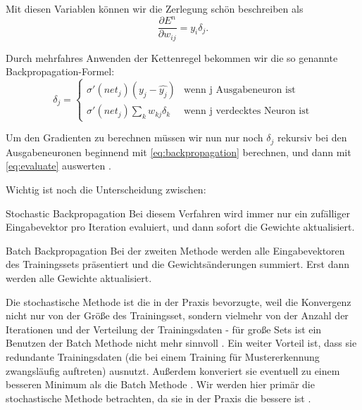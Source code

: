 Mit diesen Variablen können wir die Zerlegung schön beschreiben als
\begin{equation}
\label{eq:evaluate}
  \frac{\partial E^n}{\partial w_{ij}} = y_i \delta_j.
\end{equation}

Durch mehrfahres Anwenden der Kettenregel bekommen wir die so genannte Backpropagation-Formel:
\begin{equation}
\label{eq:backpropagation}
\delta_j =  \begin{cases}
               \sigma ' (net_j) (y_j - \hat{y_j})          & \text{wenn j Ausgabeneuron ist}\\
               \sigma ' (net_j) \sum_k w_{kj} \delta_k     & \text{wenn j verdecktes Neuron ist}
           \end{cases} 
\end{equation} 

Um den Gradienten zu berechnen müssen wir nun nur noch $\delta_j$ rekursiv bei den Ausgabeneuronen beginnend mit \ref{eq:backpropagation} berechnen, und dann mit \ref{eq:evaluate} auswerten \cite{bishop1995neural}. 

Wichtig ist noch die Unterscheidung zwischen:

\begin{LaTeXdescription}
	\item[Stochastic Backpropagation]
	Bei diesem Verfahren wird immer nur ein zufälliger Eingabevektor pro Iteration evaluiert, und dann sofort die Gewichte aktualisiert. 
	\item[Batch Backpropagation] 
	Bei der zweiten Methode werden alle Eingabevektoren des Trainingssets präsentiert und die Gewichtsänderungen summiert. Erst dann werden alle Gewichte aktualisiert.\cite{duda2012pattern}
\end{LaTeXdescription}

Die stochastische Methode ist die in der Praxis bevorzugte, weil die Konvergenz nicht nur von der Größe des Trainingsset, sondern vielmehr von der Anzahl der Iterationen und der Verteilung der Trainingsdaten - für große Sets ist ein Benutzen der Batch Methode nicht mehr sinnvoll \cite{bengio2012practical}.
Ein weiter Vorteil ist, dass sie redundante Trainingsdaten (die bei einem Training für Mustererkennung zwangsläufig auftreten) ausnutzt. Außerdem konveriert sie eventuell zu einem besseren Minimum als die Batch Methode \cite{lecunefficient}.
Wir werden hier primär die stochastische Methode betrachten, da sie in der Praxis die bessere ist \cite{lecunefficient, bengio2012practical}.


